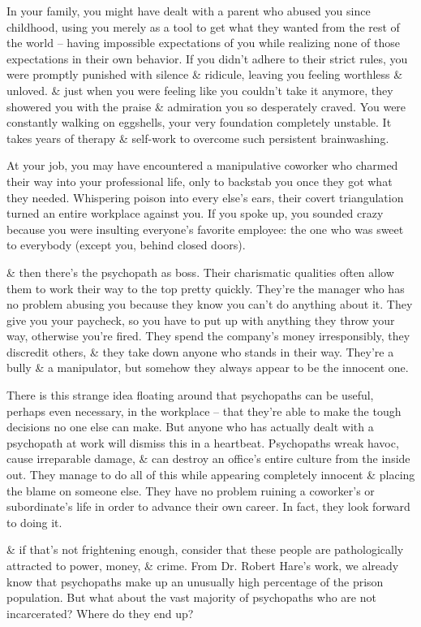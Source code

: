 \documentclass{article}
\numberwithin{equation}{section}
\begin{document}
In your family, you might have dealt with a parent who abused you since childhood, using you merely as a tool to get what they wanted from the rest of the world -- having impossible expectations of you while realizing none of those expectations in their own behavior. If you didn't adhere to their strict rules, you were promptly punished with silence \& ridicule, leaving you feeling worthless \& unloved. \& just when you were feeling like you couldn't take it anymore, they showered you with the praise \& admiration you so desperately craved. You were constantly walking on eggshells, your very foundation completely unstable. It takes years of therapy \& self-work to overcome such persistent brainwashing.

At your job, you may have encountered a manipulative coworker who charmed their way into your professional life, only to backstab you once they got what they needed. Whispering poison into every else's ears, their covert triangulation turned an entire workplace against you. If you spoke up, you sounded crazy because you were insulting everyone's favorite employee: the one who was sweet to everybody (except you, behind closed doors).

\& then there's the psychopath as boss. Their charismatic qualities often allow them to work their way to the top pretty quickly. They're the manager who has no problem abusing you because they know you can't do anything about it. They give you your paycheck, so you have to put up with anything they throw your way, otherwise you're fired. They spend the company's money irresponsibly, they discredit others, \& they take down anyone who stands in their way. They're a bully \& a manipulator, but somehow they always appear to be the innocent one.

There is this strange idea floating around that psychopaths can be useful, perhaps even necessary, in the workplace -- that they're able to make the tough decisions no one else can make. But anyone who has actually dealt with a psychopath at work will dismiss this in a heartbeat. Psychopaths wreak havoc, cause irreparable damage, \& can destroy an office's entire culture from the inside out. They manage to do all of this while appearing completely innocent \& placing the blame on someone else. They have no problem ruining a coworker's or subordinate's life in order to advance their own career. In fact, they look forward to doing it.

\& if that's not frightening enough, consider that these people are pathologically attracted to power, money, \& crime. From Dr. Robert Hare's work, we already know that psychopaths make up an unusually high percentage of the prison population. But what about the vast majority of psychopaths who are not incarcerated? Where do they end up?
\end{document}
